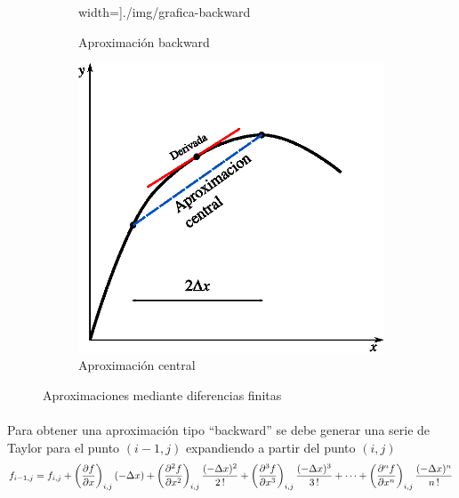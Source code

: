 \documentclass[letterpaper, openright, 12pt]{book}
\begin{document}
\begin{figure}[htbp!]
\begin{subfigure}[c]{0.45\textwidth}
                width=\textwidth]{./img/grafica-backward}
            \caption{Aproximación backward}
            \label{fig:grafica_backward}
        \end{subfigure}
        \begin{subfigure}[c]{0.45\textwidth}
            \includegraphics[keepaspectratio,
                width=\textwidth]{./img/grafica-central}
            \caption{Aproximación central}
            \label{fig:grafica_central}
        \end{subfigure}
        \captionsetup{margin=2cm}
        \caption{Aproximaciones mediante diferencias finitas}
        \label{fig:grafica_aproximaciones}
    \end{figure}

\paragraph*{}
    Para obtener una aproximación tipo ``backward'' se debe generar una serie
    de Taylor para el punto $(i-1, j)$ expandiendo a partir del punto $(i, j)$
    \begin{equation}
    f_{i-1, j} = f_{i,j} + \left(\pdv{f}{x}\right)_{i,j} (-\Delta x)
    + \left(\pdv[2]{f}{x} \right)_{i,j} \frac{(-\Delta x)^2 }{2\,!}
    + \left( \pdv[3]{f}{x} \right)_{i,j} \frac{(-\Delta x)^3}{3\,!}
    + \dotsb + \left(\pdv[n]{f}{x} \right)_{i,j} \frac{(-\Delta x)^n}{n\,!}
    \label{taylor-backward}
    \end{equation}
\end{document}
